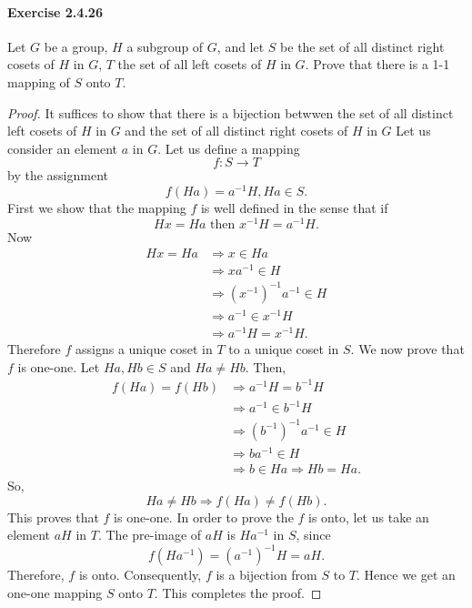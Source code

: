 \documentclass{article}
\begin{document}
\paragraph{Exercise 2.4.26} Let $G$ be a group, $H$ a subgroup of $G$, and let $S$ be the set of all distinct right cosets of $H$ in $G$, $T$ the set of all left cosets of $H$ in $G$. Prove that there is a 1-1 mapping of $S$ onto $T$.
\begin{proof}
    It suffices to show that there is a bijection betwwen the set of all distinct left cosets of $H$ in $G$ and the set of all distinct right cosets of $H$ in $G$
Let us consider an element $a$ in $G$.
Let us define a mapping
$$
f: S \rightarrow T
$$
by the assignment
$$
f(H a)=a^{-1} H, H a \in S .
$$
First we show that the mapping $f$ is well defined in the sense that if
$$
H x=H a \text { then } x^{-1} H=a^{-1} H .
$$
Now
$$
\begin{aligned}
H x=H a & \Longrightarrow x \in H a \\
& \Longrightarrow x a^{-1} \in H \\
& \Longrightarrow\left(x^{-1}\right)^{-1} a^{-1} \in H \\
& \Longrightarrow a^{-1} \in x^{-1} H \\
& \Longrightarrow a^{-1} H=x^{-1} H .
\end{aligned}
$$
Therefore $f$ assigns a unique coset in $T$ to a unique coset in $S$.
We now prove that $f$ is one-one.
Let $H a, H b \in S$ and $H a \neq H b$.
Then,
$$
\begin{aligned}
f(H a)=f(H b) & \Longrightarrow a^{-1} H=b^{-1} H \\
& \Longrightarrow a^{-1} \in b^{-1} H \\
& \Longrightarrow\left(b^{-1}\right)^{-1} a^{-1} \in H \\
& \Longrightarrow b a^{-1} \in H \\
& \Longrightarrow b \in H a \Longrightarrow H b=H a .
\end{aligned}
$$
So,
$$
H a \neq H b \Longrightarrow f(H a) \neq f(H b) .
$$
This proves that $f$ is one-one.
In order to prove the $f$ is onto, let us take an element $a H$ in $T$. The pre-image of $a H$ is $H a^{-1}$ in $S$, since
$$
f\left(H a^{-1}\right)=\left(a^{-1}\right)^{-1} H=a H .
$$
Therefore, $f$ is onto.
Consequently, $f$ is a bijection from $S$ to $T$.
Hence we get an one-one mapping $S$ onto $T$.
This completes the proof.
\end{proof}
\end{document}

